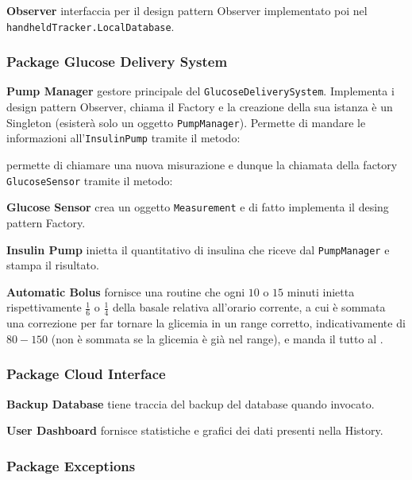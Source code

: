 \documentclass[twocolumn]{article}
\begin{document}
\textbf{Observer}
\newline interfaccia per il design pattern Observer implementato poi nel \texttt{handheldTracker.LocalDatabase}.


\subsubsection{Package Glucose Delivery System}

\textbf{Pump Manager}
\newline gestore principale del \texttt{GlucoseDeliverySystem}. Implementa i design pattern Observer, chiama il Factory e la creazione della sua istanza è un Singleton (esisterà solo un oggetto \texttt{PumpManager}). Permette di mandare le informazioni all'\texttt{InsulinPump} tramite il metodo:

permette di chiamare una nuova misurazione e dunque la chiamata della factory \texttt{GlucoseSensor} tramite il metodo:


\textbf{Glucose Sensor}
\newline crea un oggetto \texttt{Measurement} e di fatto implementa il desing pattern Factory.

\textbf{Insulin Pump}
\newline inietta il quantitativo di insulina che riceve dal \texttt{PumpManager} e stampa il risultato.

\textbf{Automatic Bolus}
\newline fornisce una routine che ogni $10$ o $15$ minuti inietta rispettivamente \(\frac{1}{6}\) o \(\frac{1}{4}\) della basale relativa all'orario corrente, a cui è sommata una correzione per far tornare la glicemia in un range corretto, indicativamente di $80-150$ (non è sommata se la glicemia è già nel range), e manda il tutto al .


\subsubsection{Package Cloud Interface}

\textbf{Backup Database}
\newline tiene traccia del backup del database quando invocato.

\textbf{User Dashboard}
\newline fornisce statistiche e grafici dei dati presenti nella History.


\subsubsection{Package Exceptions}
\end{document}
